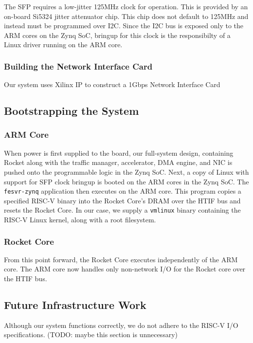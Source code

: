     The SFP requires a low-jitter 125MHz clock for operation. This is provided
    by an on-board Si5324 jitter attenuator chip. This chip does not default to 
    125MHz and instead must be programmed over I2C. Since the I2C bus is exposed
    only to the ARM cores on the Zynq SoC, bringup for this clock is the 
    responsibilty of a Linux driver running on the ARM core.

\subsubsection{Building the Network Interface Card}

    Our system uses Xilinx IP to construct a 1Gbps Network Interface Card

    \cite{pcspma}
    \cite{trimac}

\subsection{Bootstrapping the System}
    \subsubsection{ARM Core}

    When power is first supplied to the board, our full-system design, containing
    Rocket along with the traffic manager, accelerator, DMA engine, and NIC is 
    pushed onto the programmable logic in the Zynq SoC. Next, a copy of Linux
    with support for SFP clock bringup is booted on the ARM cores in the Zynq
    SoC. The \texttt{fesvr-zynq} application then executes on the ARM core. 
    This program copies a specified RISC-V binary into the Rocket Core's DRAM 
    over the HTIF bus and resets the Rocket Core. In our case, we supply a 
    \texttt{vmlinux} binary containing the RISC-V Linux kernel, along with a 
    root filesystem.

    \subsubsection{Rocket Core}

    From this point forward, the Rocket Core executes independently of the ARM 
    core. The ARM core now handles only non-network I/O for the Rocket core over
    the HTIF bus. 



\subsection{Future Infrastructure Work}
    Although our system functions correctly, we do not adhere to the RISC-V
    I/O specifications. (TODO: maybe this section is unnecessary)
